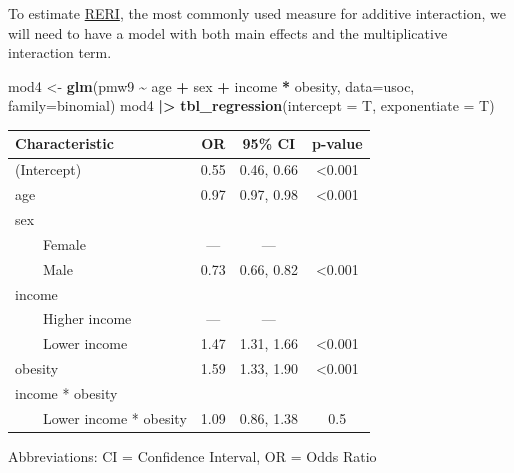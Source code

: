 \documentclass[
]{book}
\newenvironment{Shaded}{\begin{snugshade}}{\end{snugshade}}
\newcommand{\AttributeTok}[1]{\textcolor[rgb]{0.13,0.29,0.53}{#1}}
\newcommand{\FunctionTok}[1]{\textcolor[rgb]{0.13,0.29,0.53}{\textbf{#1}}}
\newcommand{\NormalTok}[1]{#1}
\newcommand{\OtherTok}[1]{\textcolor[rgb]{0.56,0.35,0.01}{#1}}
\newcommand{\SpecialCharTok}[1]{\textcolor[rgb]{0.81,0.36,0.00}{\textbf{#1}}}
\begin{document}
To estimate \hyperref[acronyms_RERI]{RERI}, the most commonly used measure for additive interaction, we will need to have a model with both main effects and the multiplicative interaction term.

\begin{Shaded}
\begin{Highlighting}[]
\NormalTok{mod4 }\OtherTok{\textless{}{-}} \FunctionTok{glm}\NormalTok{(pmw9 }\SpecialCharTok{\textasciitilde{}}\NormalTok{ age }\SpecialCharTok{+}\NormalTok{ sex }\SpecialCharTok{+}\NormalTok{ income }\SpecialCharTok{*}\NormalTok{ obesity, }\AttributeTok{data=}\NormalTok{usoc, }\AttributeTok{family=}\NormalTok{binomial)}
\NormalTok{mod4 }\SpecialCharTok{|\textgreater{}} \FunctionTok{tbl\_regression}\NormalTok{(}\AttributeTok{intercept =}\NormalTok{ T, }\AttributeTok{exponentiate =}\NormalTok{ T)}
\end{Highlighting}
\end{Shaded}

\begin{table}[t]
\fontsize{12.0pt}{14.0pt}\selectfont
\begin{tabular*}{\linewidth}{@{\extracolsep{\fill}}lccc}
\toprule
\textbf{Characteristic} & \textbf{OR} & \textbf{95\% CI} & \textbf{p-value} \\ 
\midrule\addlinespace[2.5pt]
(Intercept) & 0.55 & 0.46, 0.66 & <0.001 \\ 
age & 0.97 & 0.97, 0.98 & <0.001 \\ 
sex &  &  &  \\ 
    Female & — & — &  \\ 
    Male & 0.73 & 0.66, 0.82 & <0.001 \\ 
income &  &  &  \\ 
    Higher income & — & — &  \\ 
    Lower income & 1.47 & 1.31, 1.66 & <0.001 \\ 
obesity & 1.59 & 1.33, 1.90 & <0.001 \\ 
income * obesity &  &  &  \\ 
    Lower income * obesity & 1.09 & 0.86, 1.38 & 0.5 \\ 
\bottomrule
\end{tabular*}
\begin{minipage}{\linewidth}
\vspace{.05em}
Abbreviations: CI = Confidence Interval, OR = Odds Ratio\\
\end{minipage}
\end{table}
\end{document}
